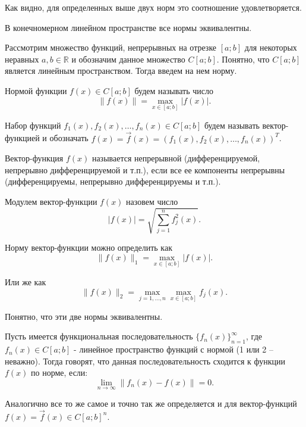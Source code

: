 	Как видно, для определенных выше двух норм это соотношение удовлетворяется.
	
	\begin{proposition}
		В конечномерном линейном пространстве все нормы эквивалентны.
	\end{proposition}

	Рассмотрим множество функций, непрерывных на отрезке $[a; b]$ для некоторых неравных $a, b \in \mathbb{R}$ и обозначим данное множество $C[a; b]$. Понятно, что $C[a; b]$ является линейным пространством. Тогда введем на нем норму.
	
	\begin{definition}
		Нормой функции $f(x) \in C[a; b]$ будем называть число $$\|f(x)\| = \max_{x \in [a; b]}|f(x)|.$$
	\end{definition}

	\begin{definition}
		Набор функций $f_1(x), f_2(x), \dots, f_n(x) \in C[a; b]$ будем называть вектор-функцией и обозначать $f(x) = \vec{f}(x) = \left(f_1(x), f_2(x), \dots, f_n(x)\right)^T$.
	\end{definition}

	\begin{definition}
		Вектор-функция $f(x)$ называется непрерывной (дифференцируемой, непрерывно дифференцируемой и т.п.), если все ее компоненты непрерывны (дифференцируемы, непрерывно дифференцируемы и т.п.).
	\end{definition}

	\begin{definition}
		Модулем вектор-функции $f(x)$ назовем число
		\begin{equation}
			|f(x)| = \sqrt{\sum_{j = 1}^{n} f_j^2(x) }.
		\end{equation}
	\end{definition}

	Норму вектор-функции можно определить как $$\|f(x)\|_1 = \max_{x \in [a; b]}|f(x)|.$$
	
	Или же как $$\|f(x)\|_2 = \max_{j = 1, \dots, n} \max_{x \in [a; b]} f_j(x).$$
	
	Понятно, что эти две нормы эквивалентны.
	
	\begin{definition}
		Пусть имеется функциональная последовательность $\{f_n(x)\}_{n = 1}^{\infty}$, где $f_n(x) \in C[a; b]$ - линейное пространство функций с нормой (1 или 2 -- неважно). Тогда говорят, что данная последовательность сходится к функции $f(x)$ по норме, если:
		\begin{equation}
			\lim\limits_{n\rightarrow \infty} \|f_n(x) - f(x)\| = 0.
		\end{equation}
	
	Аналогично все то же самое и точно так же определяется и для вектор-функций $f(x) = \vec{f}(x) \in C[a; b]^n$.
	\end{definition}

